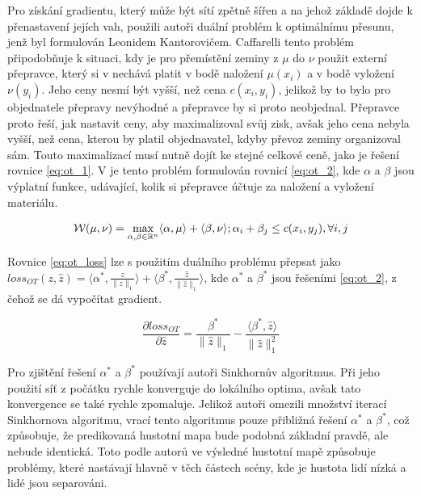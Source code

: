 Pro získání gradientu, který může být sítí zpětně šířen a na jehož základě dojde k přenastavení jejích vah, použili autoři duální problém k optimálnímu přesunu, jenž byl formulován Leonidem Kantorovičem.
Caffarelli \cite{Caffarelli_dual_problem} tento problém připodobňuje k situaci, kdy je pro přemístění zeminy z \(\mu\) do \(\nu\) použit externí přepravce, který si v nechává platit v bodě naložení \(\mu(x_i)\) a v bodě vyložení \(\nu(y_i)\).
Jeho ceny nesmí být vyšší, než cena \(c(x_i, y_i)\), jelikož by to bylo pro objednatele přepravy nevýhodné a přepravce by si proto neobjednal.
Přepravce proto řeší, jak nastavit ceny, aby maximalizoval svůj zisk, avšak jeho cena nebyla vyšší, než cena, kterou by platil objednavatel, kdyby převoz zeminy organizoval sám.
Touto maximalizací musí nutně dojít ke stejné celkové ceně, jako je řešení rovnice \ref{eq:ot_1}.
V \cite{DM_Count} je tento problém formulován rovnicí \ref{eq:ot_2}, kde \(\alpha\) a \(\beta\) jsou výplatní funkce, udávající, kolik si přepravce účtuje za naložení a vyložení materiálu.

\begin{equation}
\mathcal{W}(\mu, \nu) = \max_{\alpha, \beta \in \mathbb{R}^n} \langle \alpha, \mu \rangle + \langle \beta, \nu \rangle; \alpha_i + \beta_j  \leq c(x_i, y_j),  \forall i, j
\label{eq:ot_2}
\end{equation}

Rovnice \ref{eq:ot_loss} lze s použitím duálního problému přepsat jako \( loss_{OT}(z, \hat{z}) = \bigg \langle \alpha^*, \frac{z}{\|z\|_1} \bigg \rangle + \bigg \langle \beta^*, \frac{\hat{z}}{\|\hat{z}\|_1} \bigg \rangle \), kde  \(\alpha^*\) a \(\beta^*\) jsou řešeními \ref{eq:ot_2}, z čehož se dá vypočítat gradient.

\begin{equation}
\frac{\partial loss_{OT}}{\partial \hat{z}} = \frac{\beta^*}{\|\hat{z}\|_1} - \frac{ \langle \beta^*, \hat{z} \rangle}{\|\hat{z}\|_1^2}
\label{eq:ot_2}
\end{equation}

Pro zjištění řešení \(\alpha^*\) a \(\beta^*\) používají autoři Sinkhornův algoritmus.
Při jeho použití síť z počátku rychle konverguje do lokálního optima, avšak tato konvergence se také rychle zpomaluje.
Jelikož autoři omezili množství iterací Sinkhornova algoritmu, vrací tento algoritmus pouze přibližná řešení \(\alpha^*\) a \(\beta^*\), což způsobuje, že predikovaná hustotní mapa bude  podobná základní pravdě, ale nebude identická.
Toto podle autorů ve výsledné hustotní mapě způsobuje problémy, které nastávají hlavně v těch částech scény, kde je hustota lidí nízká a lidé jsou separováni.

